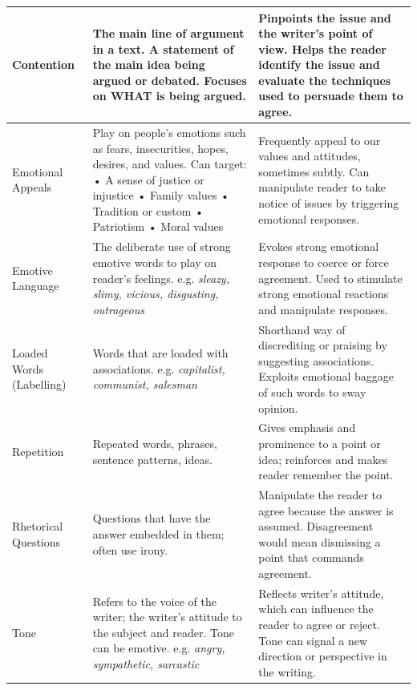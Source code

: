 \documentclass[a4paper]{article}
\begin{document}
\begin{longtable}{|p{2cm}|p{3.25cm}|p{3.25cm}|}
\hline
Contention & The main line of argument in a text. A statement of the main idea being argued or debated. Focuses on WHAT is being argued. & Pinpoints the issue and the writer’s point of view. Helps the reader identify the issue and evaluate the techniques used to persuade them to agree. \\
\hline
Emotional Appeals & Play on people's emotions such as fears, insecurities, hopes, desires, and values. \newline Can target: \newline • A sense of justice or injustice \newline • Family values \newline • Tradition or custom \newline • Patriotism \newline • Moral values & Frequently appeal to our values and attitudes, sometimes subtly. Can manipulate reader to take notice of issues by triggering emotional responses. \\
\hline
Emotive Language & The deliberate use of strong emotive words to play on reader’s feelings. \newline e.g. \textit{sleazy, slimy, vicious, disgusting, outrageous} & Evokes strong emotional response to coerce or force agreement. Used to stimulate strong emotional reactions and manipulate responses. \\
\hline
Loaded Words (Labelling) & Words that are loaded with associations. \newline e.g. \textit{capitalist, communist, salesman} & Shorthand way of discrediting or praising by suggesting associations. Exploits emotional baggage of such words to sway opinion. \\
\hline
Repetition & Repeated words, phrases, sentence patterns, ideas. & Gives emphasis and prominence to a point or idea; reinforces and makes reader remember the point. \\
\hline
Rhetorical Questions & Questions that have the answer embedded in them; often use irony. & Manipulate the reader to agree because the answer is assumed. Disagreement would mean dismissing a point that commands agreement. \\
\hline
Tone & Refers to the voice of the writer; the writer's attitude to the subject and reader. Tone can be emotive. \newline e.g. \textit{angry, sympathetic, sarcastic} & Reflects writer's attitude, which can influence the reader to agree or reject. Tone can signal a new direction or perspective in the writing. \\
\hline

\end{longtable}
\newpage
\end{document}
